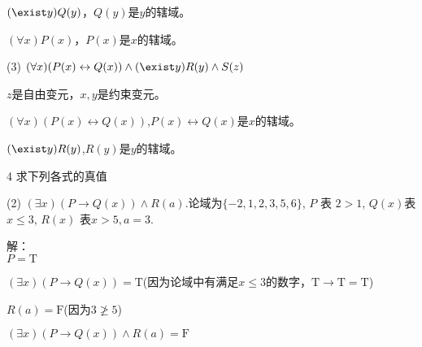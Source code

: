\documentclass[
]{article}
\begin{document}
\(( \exist y )Q( y )\)，\(Q( y )\)是\(y\)的辖域。

\(( \forall x ) P ( x )\)，\(P ( x )\)是\(x\)的辖域。

(3)
\(( \forall x ) ( P ( x ) \leftrightarrow Q( x ) ) \wedge ( \exist y ) R( y ) \wedge S( z)\)

\(z\)是自由变元，\(x,y\)是约束变元。

\(( \forall x ) ( P ( x ) \leftrightarrow Q( x ) )\),\(P ( x ) \leftrightarrow Q( x )\)是\(x\)的辖域。

\(( \exist y ) R( y )\),\(R( y )\)是\(y\)的辖域。

4 求下列各式的真值

(2)
\(( \exists x ) ( P\rightarrow Q( x ) ) \wedge R( a )\).论域为\(\{- 2, 1, 2, 3, 5, 6\}\),
\(P\) 表 \(2> 1\), \(Q( x )\)表 \(x \leq 3\), \(R( x )\)
表\(x > 5,a= 3\).

解：\\
\(P=\text{T}\)

\((\exists x)(P\rightarrow Q( x ))=\text{T}\)(因为论域中有满足\(x \leq 3\)的数字，\(\text{T}\rightarrow \text{T}=\text{T}\))

\(R(a)=\text{F}\)(因为\(3\ngeq 5\))

\(( \exists x ) ( P\rightarrow Q( x ) ) \wedge R( a )=\text{F}\)
\end{document}
